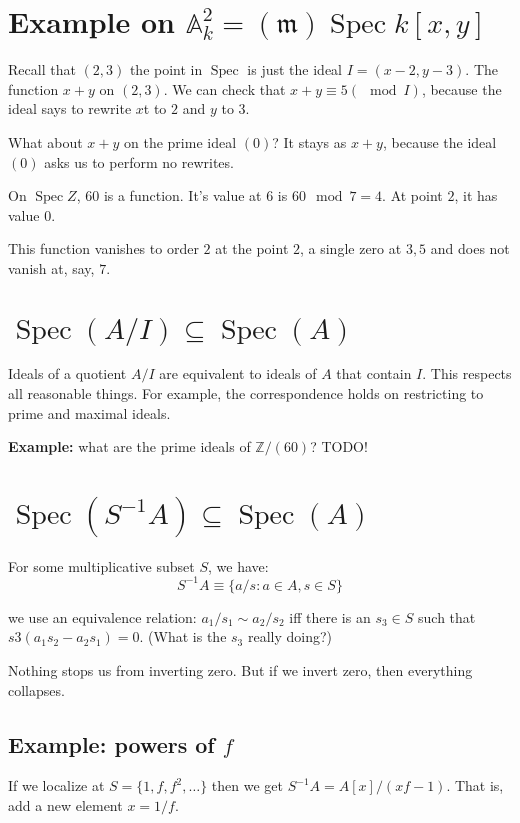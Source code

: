 \documentclass{book}
\newcommand{\Z}{\ensuremath{\mathbb{Z}}}
\newcommand{\A}{\ensuremath{\mathbb{A}}}
\newcommand{\spec}{\operatorname{Spec}}
\newcommand{\m}{\mathfrak{m}}
\theoremstyle{definition}
\begin{document}
\section{Example on $\A^2_k = (\m) \spec k[x, y]$}
Recall that $(2, 3)$ the point in $\spec$ is just the ideal $I = (x - 2, y - 3)$.
The function $x+y$ on $(2, 3)$. We can check that $x + y \equiv 5 (\mod I)$,
because the ideal says to rewrite $x$t to $2$ and $y$ to $3$.

What about $x + y$ on the prime ideal \( (0) \)?  It stays as $x + y$,
because the ideal  \((0)\) asks us to perform no rewrites.

On $\spec Z$, $60$ is a function. It's value at $6$ is $60 \mod 7 = 4$.
At point $2$, it has value $0$.


This function vanishes to order $2$ at the point $2$, a single zero at $3, 5$
and does not vanish at, say, $7$.

\section{$\spec(A/I) \subseteq \spec(A)$}

Ideals of a quotient $A/I$ are equivalent to ideals of $A$ that contain $I$.
This respects all reasonable things. For example, the correspondence holds
on restricting to prime and maximal ideals.


\textbf{Example:} what are the prime ideals of $\Z/(60)$?  TODO!

\section{$\spec(S^{-1}A) \subseteq \spec(A)$}

For some multiplicative subset $S$, we have:
$$ S^{-1} A \equiv \{ a/s : a \in A, s \in S \} $$

we use an equivalence relation: $a_1/s_1 \sim a_2/s_2$ iff there
is an $s_3 \in S$ such that $s3(a_1 s_2 - a_2 s_1) = 0$.
(What is the $s_3$ really doing?)

Nothing stops us from inverting zero. But if we invert zero, then everything
collapses.

\subsection{Example: powers of $f$}

If we localize at $S = \{ 1, f, f^2, \dots \}$ then we get $S^{-1}A = A[x]/(xf - 1)$.
That is, add a new element $x = 1/f$.
\end{document}
